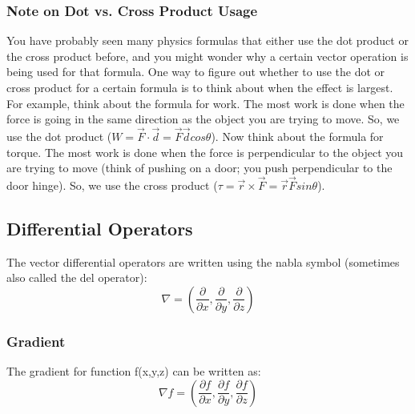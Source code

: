 \documentclass{article}
\begin{document}
\begin{center}
\end{center}

\subsubsection{Note on Dot vs. Cross Product Usage}
You have probably seen many physics formulas that either use the dot product or the cross product before, and you might wonder why a certain vector operation is being used for that formula. One way to figure out whether to use the dot or cross product for a certain formula is to think about when the effect is largest. For example, think about the formula for work. The most work is done when the force is going in the same direction as the object you are trying to move. So, we use the dot product ($W = \vec F \cdot \vec d = \vec F\vec dcos\theta$). Now think about the formula for torque. The most work is done when the force is perpendicular to the object you are trying to move (think of pushing on a door; you push perpendicular to the door hinge). So, we use the cross product ($\tau = \vec r \times \vec F = \vec r \vec F sin\theta$). 

\subsection{Differential Operators}

The vector differential operators are written using the nabla symbol (sometimes also called the del operator): 
\begin{equation}
\nabla = (\frac{\partial}{\partial x}, \frac{\partial}{\partial y}, \frac{\partial}{\partial z}) 
\end{equation}

\subsubsection{Gradient} %
The gradient for function f(x,y,z) can be written as:
\begin{equation}
 \nabla f = \left( \frac{\partial f}{\partial x}, \frac{\partial f}{\partial y}, \frac{\partial f}{\partial z} \right)
\end{equation}
\end{document}
